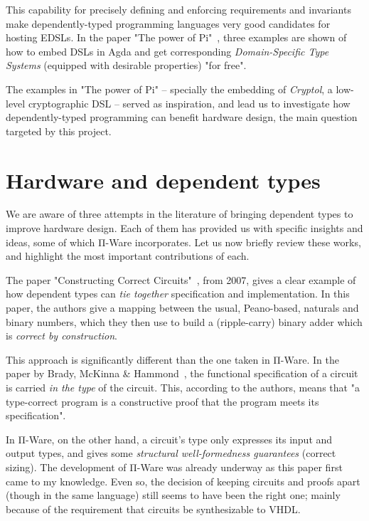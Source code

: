             This capability for precisely defining and enforcing requirements and invariants make
            dependently-typed programming languages very good candidates for hosting \acp{EDSL}.
            In the paper "The power of Pi"~\cite{power-pi}, three examples are shown of how to
            embed \acp{DSL} in Agda and get corresponding \emph{Domain-Specific Type Systems}
            (equipped with desirable properties) "for free".

            The examples in "The power of Pi" – specially the embedding of \emph{Cryptol},
            a low-level cryptographic \ac{DSL} – served as inspiration,
            and lead us to investigate how dependently-typed programming can benefit hardware
            design, the main question targeted by this project.



    \section{Hardware and dependent types}
    \label{sec:hardware-dtp}
        We are aware of three attempts in the literature of bringing dependent types to improve hardware design.
        Each of them has provided us with specific insights and ideas, some of which Π-Ware incorporates.
        Let us now briefly review these works, and highlight the most important contributions of each.

        The paper "Constructing Correct Circuits"~\cite{brady-constructing}, from 2007,
        gives a clear example of how dependent types can \emph{tie together} specification and implementation.
        In this paper, the authors give a mapping between the usual, Peano-based, naturals and binary numbers,
        which they then use to build a (ripple-carry) binary adder which is \emph{correct by construction}.

        This approach is significantly different than the one taken in Π-Ware.
        In the paper by Brady, McKinna \& Hammond~\cite{brady-constructing},
        the functional specification of a circuit is carried \emph{in the type} of the circuit.
        This, according to the authors, means that
        "a type-correct program is a constructive proof that the program meets its specification".

        In Π-Ware, on the other hand, a circuit's type only expresses its input and output types,
        and gives some \emph{structural well-formedness guarantees} (correct sizing).
        The development of Π-Ware was already underway as this paper first came to my knowledge.
        Even so, the decision of keeping circuits and proofs apart (though in the same language)
        still seems to have been the right one; mainly because of the requirement that circuits
        be synthesizable to \ac{VHDL}.

